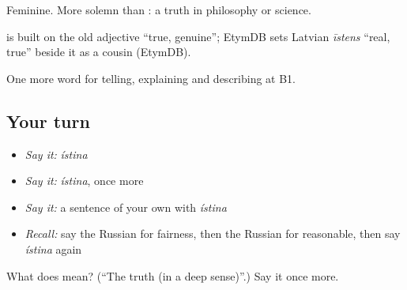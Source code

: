 Feminine. More solemn than \emph{}: a truth in philosophy or science.

\begin{cousinweb}
\textbf{} is built on the old adjective \emph{} \textquotedblleft{}true, genuine\textquotedblright{}; EtymDB sets Latvian \emph{īstens} \textquotedblleft{}real, true\textquotedblright{} beside it as a cousin (EtymDB).
\end{cousinweb}

\begin{grammarlens}[title={What you've built}]
One more word for telling, explaining and describing at B1.
\end{grammarlens}

\subsection*{Your turn}
\begin{itemize}
\raggedright
  \item \emph{Say it:} \emph{ístina}
  \item \emph{Say it:} \emph{ístina}, once more
  \item \emph{Say it:} a sentence of your own with \emph{ístina}
  \item \emph{Recall:} say the Russian for fairness, then the Russian for reasonable, then say \emph{ístina} again
\end{itemize}

\begin{tcolorbox}[breakable,colback=teal!4,colframe=teal!35!black,title={Before you move on}]
What does  mean? (\textquotedblleft{}The truth (in a deep sense)\textquotedblright{}.) Say it once more.
\end{tcolorbox}
